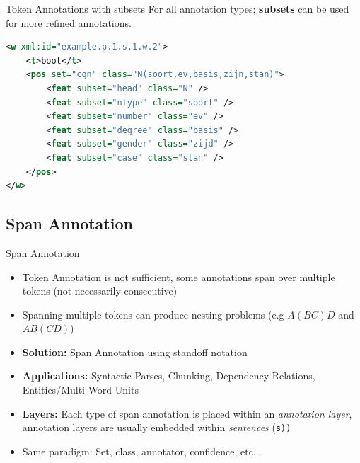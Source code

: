 \documentclass[compress,10pt]{beamer}
\begin{document}
\begin{frame}[fragile]

	\begin{block}{Token Annotations with subsets}
		For all annotation types; \textbf{subsets} can be used for more refined annotations.  
	\end{block}
	
	\begin{example}
\begin{lstlisting}[language=xml]
<w xml:id="example.p.1.s.1.w.2">
    <t>boot</t>
    <pos set="cgn" class="N(soort,ev,basis,zijn,stan)">
    	<feat subset="head" class="N" />
        <feat subset="ntype" class="soort" />
        <feat subset="number" class="ev" />
        <feat subset="degree" class="basis" />
        <feat subset="gender" class="zijd" />
        <feat subset="case" class="stan" />
    </pos>
</w>
\end{lstlisting}   
	\end{example} 

\end{frame}



\subsection{Span Annotation}
        
\begin{frame}
    \begin{block}{Span Annotation}
        \begin{itemize}
            \item Token Annotation is not sufficient, some annotations span over multiple tokens (not necessarily consecutive)
            \item Spanning multiple tokens can produce nesting problems (e.g $A (B C) D$ and $A B (C D)$)                
            \item \textbf{Solution:} Span Annotation using standoff notation
            \item \textbf{Applications:} Syntactic Parses, Chunking, Dependency Relations, Entities/Multi-Word Units
            \item \textbf{Layers:} Each type of span annotation is placed within an \emph{annotation layer}, annotation layers are usually embedded within \emph{sentences} (\texttt{s))}
            \item Same paradigm: Set, class, annotator, confidence, etc...
        \end{itemize}        
    \end{block}
\end{frame}
\end{document}
